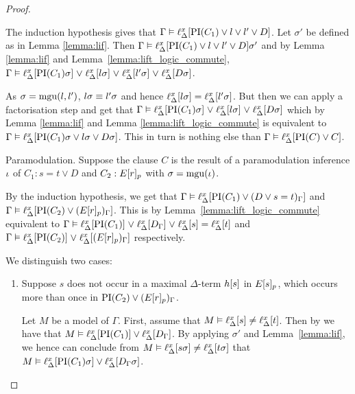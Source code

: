 {\begin{proof}
\begin{description}

			The induction hypothesis gives that
			$\Gamma \vDash \ell_{\Delta}^{x}[\operatorname{PI}(C_1) \lor l \lor l' \lor D]$.
			Let $\sigma'$ be defined as in Lemma \ref{lemma:lif}.
			Then $\Gamma \vDash \ell_{\Delta}^{x}[\operatorname{PI}(C_1) \lor l \lor l' \lor D]\sigma'$ and by Lemma \ref{lemma:lif} and Lemma~\ref{lemma:lift_logic_commute},
			$\Gamma \vDash \ell_{\Delta}^{x}[\operatorname{PI}(C_1)\sigma] \;{\lor}\; \ell_{\Delta}^{x}[l\sigma] \;{\lor}\; \ell_{\Delta}^{x}[l'\sigma] \;{\lor}\; \ell_{\Delta}^{x}[D\sigma]$.

			As $\sigma = \operatorname{mgu}(l, l')$, $l\sigma \equiv l'\sigma$ and hence $\ell_{\Delta}^{x}[l\sigma] = \ell_{\Delta}^{x}[l'\sigma]$.
			But then we can apply a factorisation step and get that
			$\Gamma \vDash \ell_{\Delta}^{x}[\operatorname{PI}(C_1)\sigma] \;{\lor}\; \ell_{\Delta}^{x}[l\sigma] \;{\lor}\; \ell_{\Delta}^{x}[D\sigma]$
			which by Lemma \ref{lemma:lif} and Lemma \ref{lemma:lift_logic_commute} is equivalent to 
			$\Gamma \entails\nolinebreak \lifdelta{\PI(C_1)\sigma \lor l\sigma \lor D\sigma}$.
			This in turn is nothing else than $\Gamma \vDash \ell_{\Delta}^{x}[\operatorname{PI}(C) \lor C]$.

		\item{Paramodulation.}
			Suppose the clause $C$ is the result of a paramodulation inference\nolinebreak{} $\iota$ of $C_1: s=t \lor   D$ and $C_2: E{[r]_{p}}$ with $\sigma=\operatorname{mgu}(\iota)$.


			By the induction hypothesis, we get that 
			$\Gamma \vDash \ell_{\Delta}^{x}[\operatorname{PI}(C_1) \lor (D\lor s=t)_\Gamma]$ and 
			$\Gamma \vDash \ell_{\Delta}^{x}[\operatorname{PI}(C_2) \lor (E{[r]_{p}})_\Gamma]$.
			This is by Lemma~\ref{lemma:lift_logic_commute} equivalent to
			\markA{} $\Gamma \vDash \ell_{\Delta}^{x}[\operatorname{PI}(C_1)] \;{\lor}\;\allowbreak \ell_{\Delta}^{x}[D_\Gamma] \;{\lor}\; \ell_{\Delta}^{x}[s] = \ell_{\Delta}^{x}[t]$
			and \markB{} 
			$\Gamma \vDash \ell_{\Delta}^{x}[\operatorname{PI}(C_2)] \;{\lor}\; \ell_{\Delta}^{x}[(E{[r]_{p}})_\Gamma]$ respectively.


			We distinguish two cases:\nopagebreak
			\begin{enumerate}
				\item Suppose $s$ does not occur in a maximal $\Delta$-term $h[s]$ in $E{[s]_{p}}$, which occurs more than once in $\operatorname{PI}(C_2) \lor (E{[r]_{p}})_\Gamma$.
					\label{klehjy}

					Let $M$ be a model of $\Gamma$.
					First, assume that $M \vDash \ell_{\Delta}^{x}[s] \neq \ell_{\Delta}^{x}[t]$.
					Then by \markA{} we have that $M \vDash \ell_{\Delta}^{x}[\operatorname{PI}(C_1)] \lor \ell_{\Delta}^{x}[D_\Gamma]$.
					By applying $\sigma'$ and Lemma~\ref{lemma:lif}, we hence can conclude from 
					$M \vDash \ell_{\Delta}^{x}[s\sigma] \neq \ell_{\Delta}^{x}[t\sigma]$ that 
					$M \vDash \ell_{\Delta}^{x}[\operatorname{PI}(C_1)\sigma] \lor \ell_{\Delta}^{x}[D_\Gamma\sigma]$.



\end{enumerate}
\end{description}
\end{proof}}
